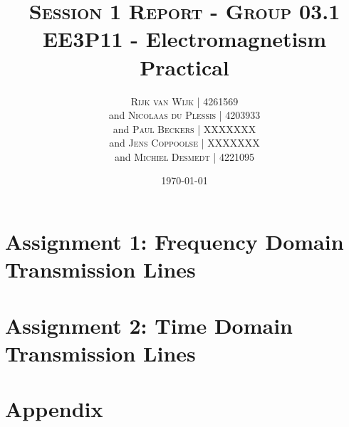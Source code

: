 \documentclass[11pt, a4paper, oneside]{article}
\title{\textsc{Session 1 Report - Group 03.1}
	\newline \textbf{EE3P11 - Electromagnetism Practical}\\
}
\author{
	\textsc{Rijk van Wijk | 4261569}\\
	and
	\textsc{Nicolaas du Plessis | 4203933}\\
	and
	\textsc{Paul Beckers | XXXXXXX}\\
	and
	\textsc{Jens Coppoolse | XXXXXXX}\\
	and
	\textsc{Michiel Desmedt | 4221095}\\
}
\date {\today}
\let\stdsection\section
\renewcommand\section{\newpage\stdsection}
\begin{document}
	\maketitle
	\thispagestyle{empty}
	\newpage
	
	\section*{Assignment 1: Frequency Domain Transmission Lines}
	
	\section*{Assignment 2: Time Domain Transmission Lines}
	
	

	\section*{Appendix}
	
\end{document}
